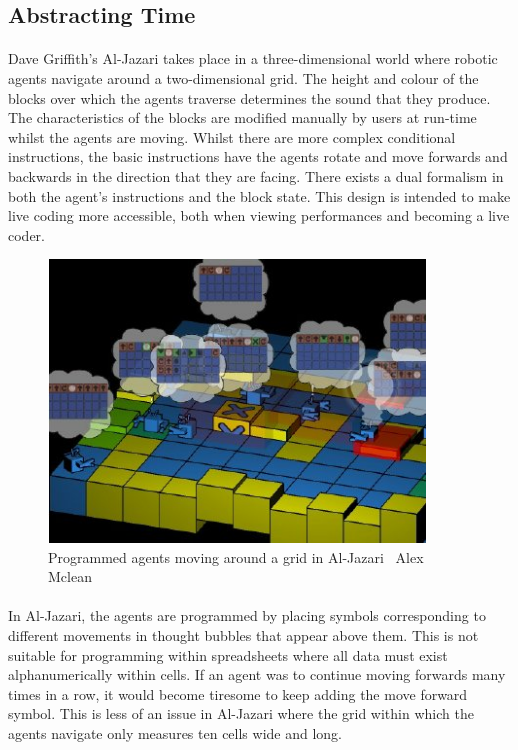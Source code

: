 \subsection{Abstracting Time}

\paragraph{} Dave Griffith's Al-Jazari \cite{mclean:visualisation} takes place in a three-dimensional world where robotic agents navigate around a two-dimensional grid. The height and colour of the blocks over which the agents traverse determines the sound that they produce. The characteristics of the blocks are modified manually by users at run-time whilst the agents are moving. Whilst there are more complex conditional instructions, the basic instructions have the agents rotate and move forwards and backwards in the direction that they are facing. There exists a dual formalism in both the agent's instructions and the block state. This design is intended to make live coding more accessible, both when viewing performances and becoming a live coder.

\begin{figure}[ht]
  \centerline{\includegraphics[width=100mm]{figs/alJazari.jpg}}
\caption{Programmed agents moving around a grid in Al-Jazari \textcopyright\ Alex Mclean}
\label{prep:alJazari}
\end{figure}

\paragraph{} In Al-Jazari, the agents are programmed by placing symbols corresponding to different movements in thought bubbles that appear above them. This is not suitable for programming within spreadsheets where all data must exist alphanumerically within cells. If an agent was to continue moving forwards many times in a row, it would become tiresome to keep adding the move forward symbol. This is less of an issue in Al-Jazari where the grid within which the agents navigate only measures ten cells wide and long.

